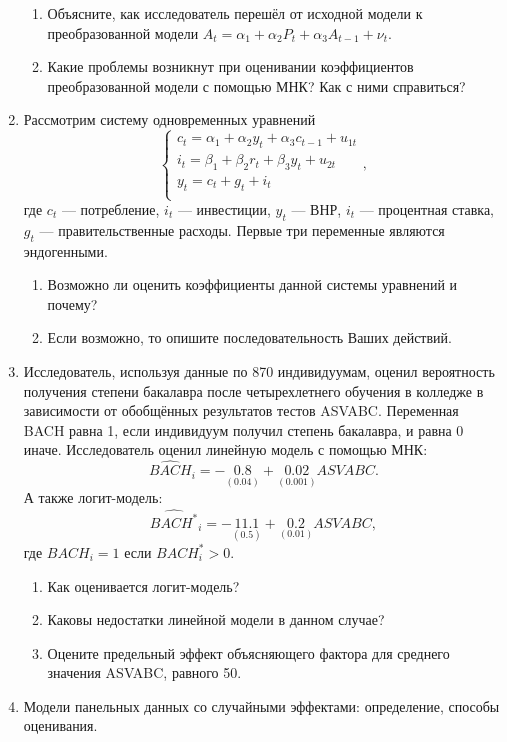 \documentclass[12pt, a4paper]{article}\usepackage[]{graphicx}\usepackage[]{color}
\begin{document}
\begin{enumerate}
\begin{enumerate}
\item Объясните, как исследователь перешёл от исходной модели к преобразованной модели $A_t = \alpha_1 + \alpha_2 P_t + \alpha_3 A_{t-1} + \nu_t$.
\item Какие проблемы возникнут при оценивании коэффициентов преобразованной модели с помощью МНК? Как с ними справиться?
\end{enumerate}





\item Рассмотрим систему одновременных уравнений
\[
    \begin{cases}
    c_t = \alpha_1 + \alpha_2 y_t + \alpha_3 c_{t-1} + u_{1t} \\
    i_t = \beta_1 + \beta_2 r_t + \beta_3 y_t + u_{2t} \\
    y_t = c_t + g_t + i_t \\
    \end{cases},
\]
где  $c_t$ — потребление, $i_t$ — инвестиции, $y_t$ — ВНР, $i_t$ — процентная ставка, $g_t$ — правительственные расходы. Первые три переменные являются эндогенными.

\begin{enumerate}
\item Возможно ли оценить коэффициенты данной системы уравнений и почему?
\item Если возможно, то опишите последовательность Ваших действий.
\end{enumerate}



\item Исследователь, используя данные по 870 индивидуумам, оценил вероятность получения степени бакалавра после четырехлетнего обучения в колледже в зависимости от обобщённых результатов тестов ASVABC. Переменная BACH равна 1, если индивидуум получил степень бакалавра, и равна 0 иначе. Исследователь оценил линейную модель с помощью МНК:
\[
\widehat{BACH}_i = -\underset{(0.04)}{0.8} + \underset{(0.001)}{0.02}ASVABC.
\]
А также логит-модель:
\[
\widehat{BACH^*}_i =  -\underset{(0.5)}{11.1} + \underset{(0.01)}{0.2}ASVABC,
\]
где $BACH_i=1$ если $BACH^*_i > 0$.

\begin{enumerate}
\item Как оценивается логит-модель?
\item Каковы недостатки линейной модели в данном случае?
\item Оцените предельный эффект объясняющего фактора для среднего значения ASVABC, равного 50.
\end{enumerate}


\item Модели панельных данных со случайными эффектами: определение, способы оценивания.

\end{enumerate}
\end{document}
